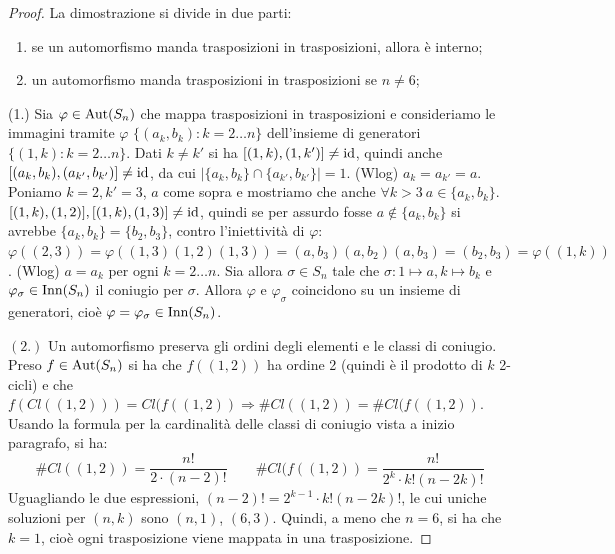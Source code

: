 \begin{proof}
    La dimostrazione si divide in due parti: 
    \begin{enumerate}
    \item se un automorfismo manda trasposizioni in trasposizioni, allora è interno;
    \item un automorfismo manda trasposizioni in trasposizioni se $n \neq 6$;
    \end{enumerate}
    (1.) Sia $\varphi \in \text{Aut}(S_n)$ che mappa trasposizioni in trasposizioni e consideriamo le immagini tramite $\varphi$ $\{ (a_k,b_k) : k = 2 \dots n \}$ dell'insieme di generatori $\{ (1,k) : k = 2 \dots n \}$. Dati $k \neq k'$ si ha $[(1, k), (1, k')] \neq \text{id}$, quindi anche $[(a_k,b_k),(a_{k'},b_{k'})] \neq \text{id}$, da cui $\lvert \{a_k,b_k\} \cap \{a_{k'},b_{k'}\} \rvert = 1$. (Wlog) $a_k = a_{k'} = a$. Poniamo $k=2,k'=3$, $a$ come sopra e mostriamo che anche $\forall k > 3 \ a \in \{a_k, b_k\}$. $[(1,k),(1,2)],[(1,k),(1,3)] \neq \text{id}$, quindi se per assurdo fosse $a \notin \{a_k,b_k\}$ si avrebbe $\{a_k,b_k\} = \{b_2,b_3\}$, contro l'iniettività di $\varphi$: $\varphi((2,3)) = \varphi((1,3)(1,2)(1,3)) = (a,b_3)(a,b_2)(a,b_3) = (b_2,b_3) = \varphi((1,k))$. (Wlog) $a = a_k$ per ogni $k = 2\dots n$. Sia allora $\sigma \in S_n$ tale che $\sigma: 1 \mapsto a, k \mapsto b_k$ e $\varphi_\sigma \in \text{Inn}(S_n)$ il coniugio per $\sigma$. Allora $\varphi$ e $\varphi_\sigma$ coincidono su un insieme di generatori, cioè $\varphi = \varphi_\sigma \in \text{Inn}(S_n)$.
    
    $(2.)$ Un automorfismo preserva gli ordini degli elementi e le classi di coniugio. Preso $f \in \text{Aut}(S_n)$ si ha che $f((1,2))$ ha ordine 2 (quindi è il prodotto di $k$ 2-cicli) e che $f(Cl((1,2))) = Cl(f((1,2)) \Rightarrow \#Cl((1,2)) = \#Cl(f((1,2))$. Usando la formula per la cardinalità delle classi di coniugio vista a inizio paragrafo, si ha:
    \[
    \#Cl((1,2)) = \frac{n!}{2\cdot (n-2)!}
    \qquad
    \#Cl(f((1,2)) = \frac{n!}{2^k\cdot k!(n-2k)!}
    \]
    Uguagliando le due espressioni, $(n-2)! = 2^{k-1}\cdot k!(n-2k)!$, le cui uniche soluzioni per $(n,k)$ sono $(n,1)$, $(6,3)$. Quindi, a meno che $n = 6$, si ha che $k = 1$, cioè ogni trasposizione viene mappata in una trasposizione.
\end{proof}

